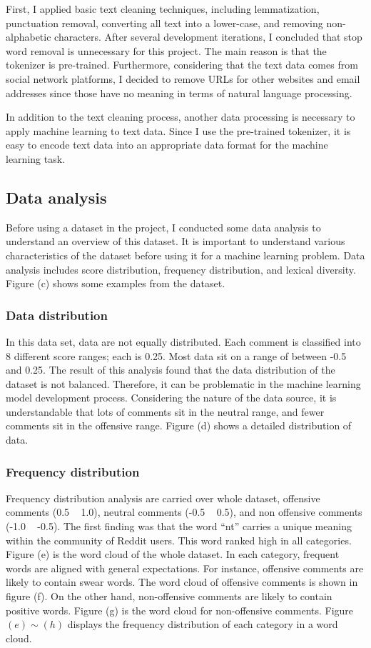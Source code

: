 \documentclass[11pt, natbib=false]{article}
\begin{document}
First, I applied basic text cleaning techniques, including lemmatization, punctuation removal, converting all text into a lower-case, and removing non-alphabetic characters.
After several development iterations, I concluded that stop word removal is unnecessary for this project.
The main reason is that the tokenizer is pre-trained.
Furthermore, considering that the text data comes from social network platforms, I decided to remove URLs for other websites and email addresses since those have no meaning in terms of natural language processing.

In addition to the text cleaning process, another data processing is necessary to apply machine learning to text data.
Since I use the pre-trained tokenizer, it is easy to encode text data into an appropriate data format for the machine learning task.


\subsection{Data analysis}
Before using a dataset in the project, I conducted some data analysis to understand an overview of this dataset.
It is important to understand various characteristics of the dataset before using it for a machine learning problem.
Data analysis includes score distribution, frequency distribution, and lexical diversity.
Figure (c) shows some examples from the dataset.

\subsubsection{Data distribution}
In this data set, data are not equally distributed.
Each comment is classified into 8 different score ranges; each is 0.25.
Most data sit on a range of between -0.5 and 0.25.
The result of this analysis found that the data distribution of the dataset is not balanced.
Therefore, it can be problematic in the machine learning model development process.
Considering the nature of the data source, it is understandable that lots of comments sit in the neutral range, and fewer comments sit in the offensive range.
Figure (d) shows a detailed distribution of data.

\subsubsection{Frequency distribution}
Frequency distribution analysis are carried over whole dataset, offensive comments (0.5 ~ 1.0), neutral comments (-0.5 ~ 0.5), and non offensive comments (-1.0 ~ -0.5).
The first finding was that the word “nt” carries a unique meaning within the community of Reddit users.
This word ranked high in all categories. Figure (e) is the word cloud of the whole dataset.
In each category, frequent words are aligned with general expectations.
For instance, offensive comments are likely to contain swear words. The word cloud of offensive comments is shown in figure (f).
On the other hand, non-offensive comments are likely to contain positive words. Figure (g) is the word cloud for non-offensive comments.
Figure $ (e) \sim (h)$ displays the frequency distribution of each category in a word cloud.
\end{document}
